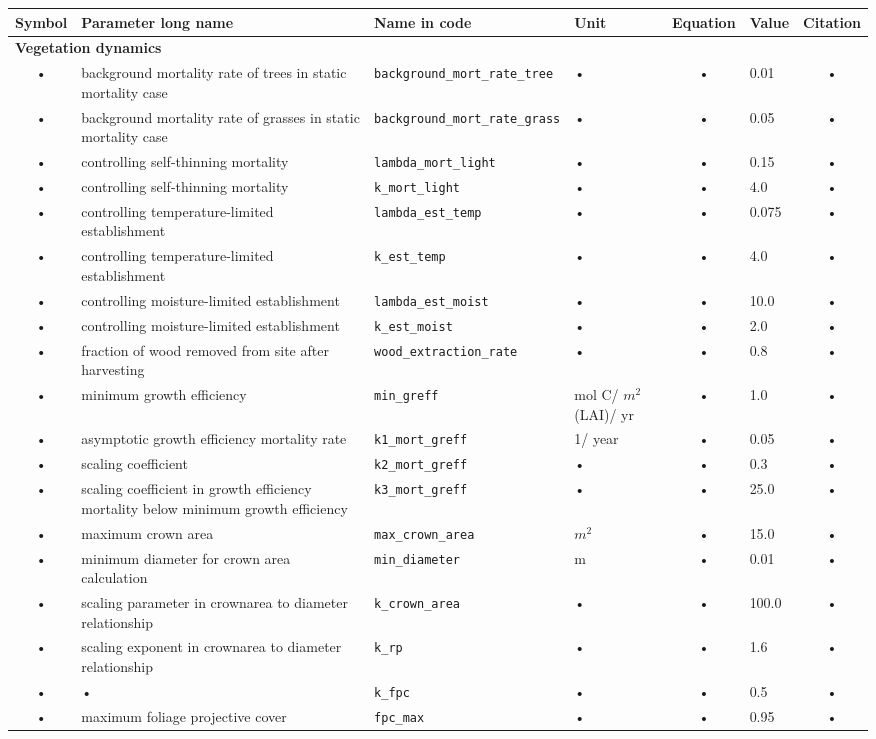 \begin{table}
\begin{tabularx}{\linewidth}{|c|X|l|l|c|l|c|} %
\hline 
Symbol & Parameter long name & Name in code & Unit & Equation & Value & Citation \\ 
\hline 

\multicolumn{6}{l}{\bf Vegetation dynamics}\\
\hline
• & background mortality rate of trees in static mortality case & \texttt{background\_mort\_rate\_tree} & • & • & 0.01 & • \\  
• & background mortality rate of grasses in static mortality case & \texttt{background\_mort\_rate\_grass} & • & • & 0.05 & • \\
• & controlling self-thinning mortality & \texttt{lambda\_mort\_light} & • & • & 0.15 & • \\
• & controlling self-thinning mortality & \texttt{k\_mort\_light} & • & • & 4.0 & • \\
• & controlling temperature-limited establishment & \texttt{lambda\_est\_temp} & • & • & 0.075 & • \\
• & controlling temperature-limited establishment & \texttt{k\_est\_temp} & • & • & 4.0 & • \\
• & controlling moisture-limited establishment & \texttt{lambda\_est\_moist} & • & • & 10.0 & • \\
• & controlling moisture-limited establishment & \texttt{k\_est\_moist} & • & • & 2.0 & • \\
• & fraction of wood removed from site after harvesting & \texttt{wood\_extraction\_rate} & • & • & 0.8 & • \\
• & minimum growth efficiency & \texttt{min\_greff} & mol C/ $m^2$ (LAI)/ yr & • & 1.0 & • \\
• & asymptotic growth efficiency mortality rate & \texttt{k1\_mort\_greff} & 1/ year & • & 0.05 & • \\
• & scaling coefficient & \texttt{k2\_mort\_greff} & • & • & 0.3 & • \\
• & scaling coefficient in growth efficiency mortality below minimum growth efficiency & \texttt{k3\_mort\_greff} & • & • & 25.0 & • \\
• & maximum crown area & \texttt{max\_crown\_area} & $m^2$ & • & 15.0 & • \\
• & minimum diameter for crown area calculation & \texttt{min\_diameter} & m & • & 0.01 & • \\
• & scaling parameter in crownarea to diameter relationship & \texttt{k\_crown\_area} & • & • & 100.0 & • \\
• & scaling exponent in crownarea to diameter relationship & \texttt{k\_rp} & • & • & 1.6 & • \\
• & • & \texttt{k\_fpc} & • & • & 0.5 & • \\
• & maximum foliage projective cover & \texttt{fpc\_max} & • & • & 0.95 & • \\
\hline 
\end{tabularx}
\end{table}



